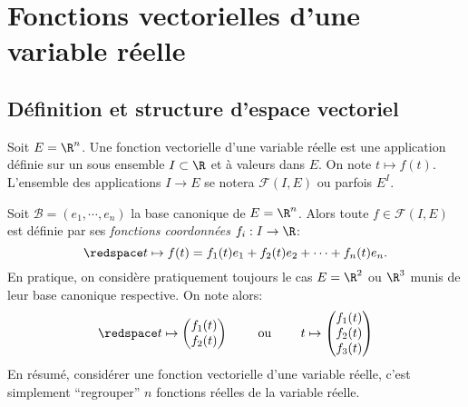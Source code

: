 \section[Fonctions vectorielles]{Fonctions vectorielles d'une variable réelle}

\subsection{Définition et structure d'espace vectoriel}

\begin{definition}
	Soit $E=\R^n$.  
	Une fonction vectorielle d'une variable réelle est une application définie sur un sous ensemble $I\subset \R$ et à valeurs dans $E$. On note $t\mapsto f(t)$. L'ensemble des applications $I\to E$ se notera $\mathcal F (I,E)$ ou parfois $E^I$.
\end{definition}

Soit $\mathcal B=(e_1,\cdots,e_n)$ la base canonique de $E=\R^n$. Alors toute $f\in\mathcal F(I,E)$  est définie par ses \emph{fonctions coordonnées} $f_i: I \to \R$:
\[\redspace
t\mapsto f(t) = f_1(t) e_1 + f_2(t) e_2 + \cdots + f_n(t) e_n.
\]
En pratique, on considère pratiquement toujours le cas $E=\R^2$ ou $\R^3$ munis de leur base canonique respective. On note alors:
\[\redspace
	t\mapsto \begin{pmatrix}f_1(t)\\f_2(t)\end{pmatrix}  \qquad \text{ ou } 	\qquad t\mapsto \begin{pmatrix}f_1(t)\\f_2(t)\\f_3(t)\end{pmatrix}  
\]
En résumé, considérer une fonction vectorielle d'une variable réelle, c'est simplement ``regrouper'' $n$ fonctions réelles de la variable réelle.

\sld{\vfill\pagebreak[5]}%


